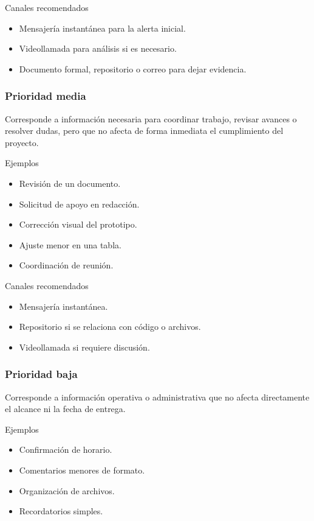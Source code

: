\documentclass[11pt,spanish]{article}
\begin{document}
\noindent Canales recomendados

\begin{itemize}
    \item Mensajería instantánea para la alerta inicial.
    \item Videollamada para análisis si es necesario.
    \item Documento formal, repositorio o correo para dejar evidencia.
\end{itemize}

\subsubsection{Prioridad media}

Corresponde a información necesaria para coordinar trabajo, revisar avances o resolver dudas, pero que no afecta de forma inmediata el cumplimiento del proyecto.

\noindent Ejemplos

\begin{itemize}
    \item Revisión de un documento.
    \item Solicitud de apoyo en redacción.
    \item Corrección visual del prototipo.
    \item Ajuste menor en una tabla.
    \item Coordinación de reunión.
\end{itemize}

\noindent Canales recomendados

\begin{itemize}
    \item Mensajería instantánea.
    \item Repositorio si se relaciona con código o archivos.
    \item Videollamada si requiere discusión.
\end{itemize}

\subsubsection{Prioridad baja}

Corresponde a información operativa o administrativa que no afecta directamente el alcance ni la fecha de entrega.

\noindent Ejemplos

\begin{itemize}
    \item Confirmación de horario.
    \item Comentarios menores de formato.
    \item Organización de archivos.
    \item Recordatorios simples.
\end{itemize}
\end{document}
